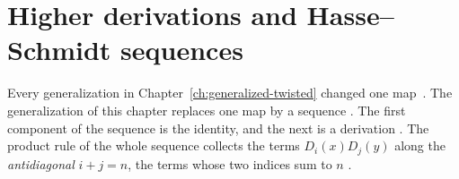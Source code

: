\section{Higher derivations and Hasse--Schmidt sequences}\label{sec:higher-multi:hasse-schmidt}

Every generalization in Chapter~\ref{ch:generalized-twisted} changed one
map~\cite[p.~2323]{FerreroHaetinger2002}. The generalization of this chapter replaces one map by a sequence
\cite[p.~2323]{FerreroHaetinger2002}. The first component of the sequence is
the identity, and the next is a derivation
\cite[p.~2323]{FerreroHaetinger2002}. The product rule of the whole sequence
collects
the terms $D_i(x)D_j(y)$ along the \emph{antidiagonal} $i+j=n$, the terms
whose two indices sum to $n$ \cite[p.~2323]{FerreroHaetinger2002}.

